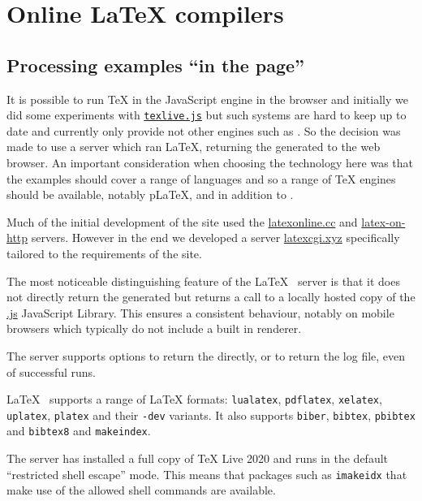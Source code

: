 \documentclass[harvardcite]{ltugboat}
\begin{document}
\section{Online \LaTeX{} compilers}

\subsection{Processing examples \enquote{in the page}}

It is possible to run \TeX{} in the JavaScript engine in the browser and
initially we did some experiments with
\href{https://github.com/manuels/texlive.js/}{\texttt{texlive.js}} but
such systems are hard to keep up to date and currently only provide
 not other engines such as . So the decision was
made to use a server which ran \LaTeX{}, returning the generated 
to the web browser.  An important consideration when choosing the
technology here was that the examples should cover a range of
languages and so a range of \TeX{} engines should be available,
notably p\LaTeX{},  and  in addition to
.

Much of the initial development of the site used the
\href{https://latexonline.cc}{latexonline.cc}
and
\href{https://latex.ytotech.com/}{latex-on-http}
servers. However in
the end we developed a server
\url{latexcgi.xyz}
specifically tailored to the
requirements of the site.

The most noticeable distinguishing feature of the \LaTeX{}~ server
is that it does not directly return the generated  but returns a
call to a locally hosted copy of the
\href{https://mozilla.github.io/pdf.js/}{.js}
JavaScript Library. This ensures a consistent behaviour, notably on
mobile browsers which typically do not include a built in 
renderer.

The server supports options to return the  directly, or to return
the log file, even of successful runs.

\LaTeX{}~ supports a range of \LaTeX{} formats:
\texttt{lualatex}, \texttt{pdflatex}, \texttt{xelatex},
\texttt{uplatex}, \texttt{platex} and their \texttt{-dev} variants. It also
supports \texttt{biber}, \texttt{bibtex}, \texttt{pbibtex} and \texttt{bibtex8} and \texttt{makeindex}.

The server has installed a full copy of \TeX{} Live 2020 and runs in
the default \enquote{restricted shell escape} mode. This means that packages
 such as \texttt{imakeidx} that make use of the allowed shell commands
are available.
\end{document}
